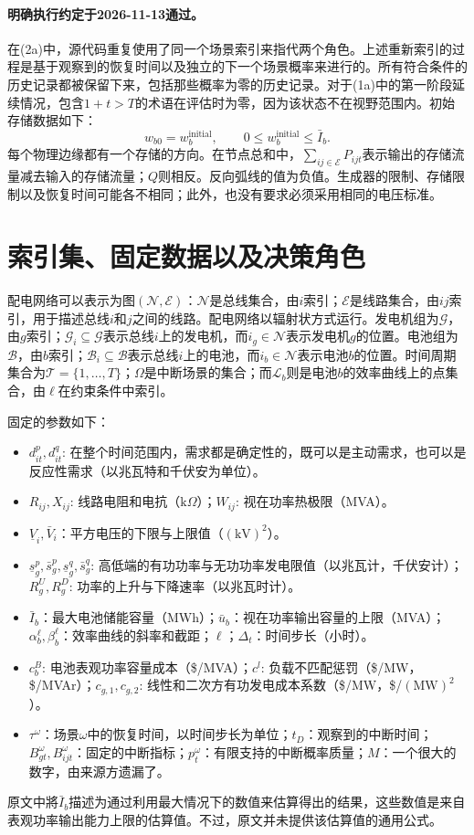 \documentclass[10pt]{article}
\begin{document}
\paragraph{明确执行约定于2026-11-13通过。}
在(2a)中，源代码重复使用了同一个场景索引来指代两个角色。上述重新索引的过程是基于观察到的恢复时间以及独立的下一个场景概率来进行的。所有符合条件的历史记录都被保留下来，包括那些概率为零的历史记录。对于(1a)中的第一阶段延续情况，包含$1+t>T$的术语在评估时为零，因为该状态不在视野范围内。初始存储数据如下：
\[w_{b0}=w_b^{\mathrm{initial}},\qquad 0\leq w_b^{\mathrm{initial}}\leq\bar I_b.\]
每个物理边缘都有一个存储的方向。在节点总和中，$\sum_{ij\in\mathcal E}P_{ijt}$表示输出的存储流量减去输入的存储流量；$Q$则相反。反向弧线的值为负值。生成器的限制、存储限制以及恢复时间可能各不相同；此外，也没有要求必须采用相同的电压标准。

\section*{索引集、固定数据以及决策角色}
配电网络可以表示为图$(\mathcal N,\mathcal E)$：$\mathcal N$是总线集合，由$i$索引；$\mathcal E$是线路集合，由$ij$索引，用于描述总线$i$和$j$之间的线路。配电网络以辐射状方式运行。发电机组为$\mathcal G$，由$g$索引；$\mathcal G_i\subseteq\mathcal G$表示总线$i$上的发电机，而$i_g\in\mathcal N$表示发电机$g$的位置。电池组为$\mathcal B$，由$b$索引；$\mathcal B_i\subseteq\mathcal B$表示总线$i$上的电池，而$i_b\in\mathcal N$表示电池$b$的位置。时间周期集合为$\mathcal T=\{1,\ldots,T\}$；$\Omega$是中断场景的集合；而$\mathcal L_b$则是电池$b$的效率曲线上的点集合，由$\ell$在约束条件中索引。

固定的参数如下：
\begin{itemize}
\item $d_{it}^p,d_{it}^q$: 在整个时间范围内，需求都是确定性的，既可以是主动需求，也可以是反应性需求（以兆瓦特和千伏安为单位）。
\item $R_{ij},X_{ij}$: 线路电阻和电抗（$\mathrm{k}\Omega$）；$W_{ij}$: 视在功率热极限（MVA）。
\item $\underline V_i,\bar V_i$：平方电压的下限与上限值（$(\mathrm{kV})^2$）。
\item $\underline s_g^p,\bar s_g^p,\underline s_g^q,\bar s_g^q$: 高低端的有功功率与无功功率发电限值（以兆瓦计，千伏安计）；$R_g^U,R_g^D$: 功率的上升与下降速率（以兆瓦时计）。
\item $\bar I_b$：最大电池储能容量（MWh）；$\bar u_b$：视在功率输出容量的上限（MVA）；$\alpha_b^\ell,\beta_b^\ell$：效率曲线的斜率和截距；$\ell$；$\Delta_t$：时间步长（小时）。
\item $c_b^B$: 电池表观功率容量成本（\$/MVA）；$c^l$: 负载不匹配惩罚（\$/MW，\$/MVAr）；$c_{g,1},c_{g,2}$: 线性和二次方有功发电成本系数（\$/MW，\$/$(\mathrm{MW})^2$）。
\item $\tau^\omega$：场景$\omega$中的恢复时间，以时间步长为单位；$t_D$：观察到的中断时间；$B_{gt}^\omega,B_{ijt}^\omega$：固定的中断指标；$p_t^\omega$：有限支持的中断概率质量；$M$：一个很大的数字，由来源方遗漏了。
\end{itemize}
原文中將$\bar I_b$描述为通过利用最大情况下的数值来估算得出的结果，这些数值是来自表观功率输出能力上限的估算值。不过，原文并未提供该估算值的通用公式。
\end{document}
